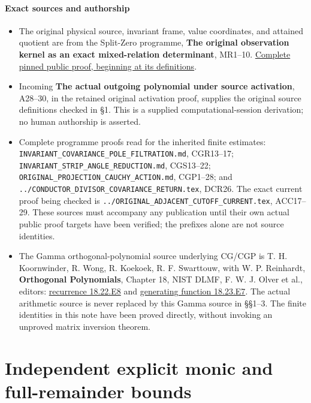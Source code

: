 \documentclass[11pt]{article}
\providecommand{\tightlist}{}
\begin{document}
\subsection{Exact sources and authorship}\label{exact-sources-and-authorship}

\begin{itemize}
\tightlist
\item
  The original physical source, invariant frame, value coordinates, and attained quotient are from the Split-Zero programme, \textbf{The original observation kernel as an exact mixed-relation determinant}, MR1--10. \href{https://github.com/KokunoYumeto/zeta-function-research-reader/blob/5992ad50c0f2a06921f1fcaded7b4e38097c0739/workbenches/splitzero-tandem/continuations/20260920-original-kernel-mixed-determinants/ORIGINAL_KERNEL_MIXED_DETERMINANT.tex\#L36}{Complete pinned public proof, beginning at its definitions}.
\item
  Incoming \textbf{The actual outgoing polynomial under source activation}, A28--30, in the retained original activation proof, supplies the original source definitions checked in §1. This is a supplied computational-session derivation; no human authorship is asserted.
\item
  Complete programme proofs read for the inherited finite estimates: \nolinkurl{INVARIANT_COVARIANCE_POLE_FILTRATION.md}, CGR13--17; \nolinkurl{INVARIANT_STRIP_ANGLE_REDUCTION.md}, CGS13--22; \nolinkurl{ORIGINAL_PROJECTION_CAUCHY_ACTION.md}, CGP1--28; and \nolinkurl{../CONDUCTOR_DIVISOR_COVARIANCE_RETURN.tex}, DCR26. The exact current proof being checked is \nolinkurl{../ORIGINAL_ADJACENT_CUTOFF_CURRENT.tex}, ACC17--29. These sources must accompany any publication until their own actual public proof targets have been verified; the prefixes alone are not source identities.
\item
  The Gamma orthogonal-polynomial source underlying CG/CGP is T. H. Koornwinder, R. Wong, R. Koekoek, R. F. Swarttouw, with W. P. Reinhardt, \textbf{Orthogonal Polynomials}, Chapter 18, NIST DLMF, F. W. J. Olver et al., editors: \href{https://dlmf.nist.gov/18.22.E8}{recurrence 18.22.E8} and \href{https://dlmf.nist.gov/18.23.E7}{generating function 18.23.E7}. The actual arithmetic source is never replaced by this Gamma source in §§1--3. The finite identities in this note have been proved directly, without invoking an unproved matrix inversion theorem.
\end{itemize}

\clearpage\part{Independent explicit monic and full-remainder bounds}
\end{document}

